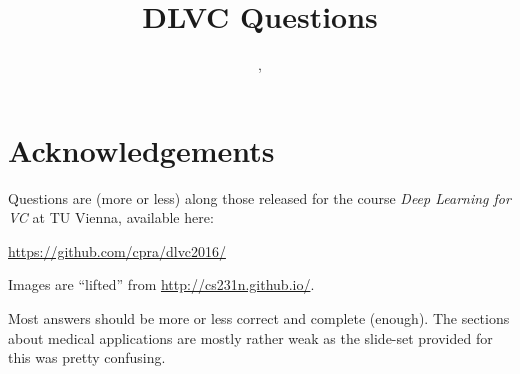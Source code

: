 \documentclass[11pt,a4paper]{article}
\title{DLVC Questions}
\author{ \authorname{Abraham Hinteregger}, \authorname{Christof Schmidt}
}
\makeatletter
\renewcommand\tableofcontents{%
    \@starttoc{toc}%
}
\makeatother
\begin{document}
\maketitle
\section*{Acknowledgements}
Questions are (more or less) along those released for the course \emph{Deep Learning for VC} at TU Vienna, available here:

\url{https://github.com/cpra/dlvc2016/}

Images are ``lifted'' from  \url{http://cs231n.github.io/}. 
 
 Most answers should be more or less correct and complete (enough). The sections about medical applications are mostly rather weak as the slide-set provided for this was pretty confusing.
 
\listoftodos

\clearpage
\begin{spacing}{-1}
\begin{multicols}{2}
  \tableofcontents
\end{multicols}
\end{spacing}
\clearpage

\end{document}
